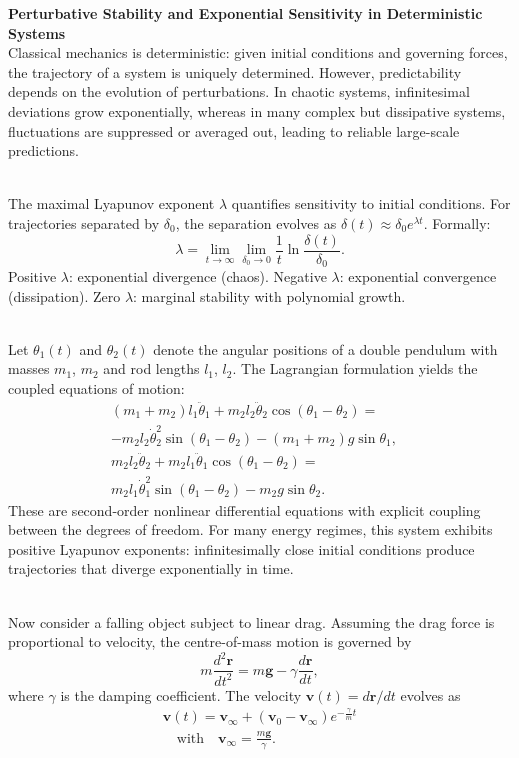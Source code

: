 \begin{technical}
{\Large\textbf{Perturbative Stability and Exponential Sensitivity in Deterministic Systems}}\\[0.5em]

Classical mechanics is deterministic: given initial conditions and governing forces, the trajectory of a system is uniquely determined. However, predictability depends on the evolution of perturbations. In chaotic systems, infinitesimal deviations grow exponentially, whereas in many complex but dissipative systems, fluctuations are suppressed or averaged out, leading to reliable large-scale predictions.

\\
The maximal Lyapunov exponent $\lambda$ quantifies sensitivity to initial conditions. For trajectories separated by $\delta_0$, the separation evolves as $\delta(t) \approx \delta_0 e^{\lambda t}$. Formally:
\[
\lambda = \lim_{t \to \infty} \lim_{\delta_0 \to 0} \frac{1}{t} \ln \frac{\delta(t)}{\delta_0}.
\]
Positive $\lambda$: exponential divergence (chaos). Negative $\lambda$: exponential convergence (dissipation). Zero $\lambda$: marginal stability with polynomial growth.

\\
Let $\theta_1(t)$ and $\theta_2(t)$ denote the angular positions of a double pendulum with masses $m_1$, $m_2$ and rod lengths $l_1$, $l_2$. The Lagrangian formulation yields the coupled equations of motion:
\begin{align*}
(m_1 + m_2) l_1 \ddot{\theta}_1 
+ m_2 l_2 \ddot{\theta}_2 \cos(\theta_1 - \theta_2) 
=&\\ -m_2 l_2 \dot{\theta}_2^2 \sin(\theta_1 - \theta_2) 
- (m_1 + m_2) g \sin\theta_1, \\[0.5em]
m_2 l_2 \ddot{\theta}_2 
+ m_2 l_1 \ddot{\theta}_1 \cos(\theta_1 - \theta_2) 
=&\\ m_2 l_1 \dot{\theta}_1^2 \sin(\theta_1 - \theta_2) 
- m_2 g \sin\theta_2.
\end{align*}
These are second-order nonlinear differential equations with explicit coupling between the degrees of freedom. For many energy regimes, this system exhibits positive Lyapunov exponents: infinitesimally close initial conditions produce trajectories that diverge exponentially in time.

\\
Now consider a falling object subject to linear drag. Assuming the drag force is proportional to velocity, the centre-of-mass motion is governed by
$$
m \frac{d^2 \mathbf{r}}{dt^2} = m \mathbf{g} - \gamma \frac{d\mathbf{r}}{dt},
$$
where $\gamma$ is the damping coefficient. The velocity $\mathbf{v}(t) = d\mathbf{r}/dt$ evolves as
\begin{align*}
\mathbf{v}(t) = \mathbf{v}_\infty + (\mathbf{v}_0 - \mathbf{v}_\infty) e^{-\frac{\gamma}{m} t}\\
\quad \text{with} \quad \mathbf{v}_\infty = \frac{m \mathbf{g}}{\gamma}.
\end{align*}


\end{technical}
